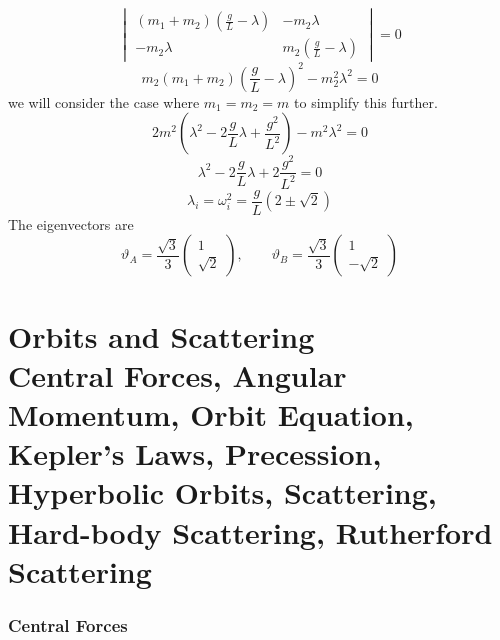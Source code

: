 \documentclass{article}
\begin{document}
    \[
    \begin{vmatrix}
        (m_1 + m_2)\left(\frac{g}{L} - \lambda\right) & -m_2\lambda\\
        -m_2\lambda & m_2\left(\frac{g}{L} - \lambda\right)
    \end{vmatrix}
    = 0
    \]
    \[m_2(m_1 + m_2)\left(\frac{g}{L} - \lambda\right)^2 - m_2^2\lambda^2 = 0\]
    we will consider the case where \(m_1 = m_2 = m\) to simplify this further.
    \[2m^2\left(\lambda^2 - 2\frac{g}{L}\lambda + \frac{g^2}{L^2}\right) - m^2\lambda^2 = 0\]
    \[\lambda^2 - 2\frac{g}{L}\lambda + 2\frac{g^2}{L^2} = 0\]
    \[\lambda_i = \omega_i^2 = \frac{g}{L}(2\pm\sqrt{2})\]
    The eigenvectors are
    \[\vartheta_A = \frac{\sqrt{3}}{3}\begin{pmatrix} 1 \\ \sqrt{2}\end{pmatrix},\qquad \vartheta_B = \frac{\sqrt{3}}{3}\begin{pmatrix}1 \\ -\sqrt{2}\end{pmatrix}\]
    
    \part[Orbits and Scattering]{Orbits and Scattering\\[\bigskipamount]\large Central Forces, Angular Momentum, Orbit Equation, Kepler's Laws, Precession, Hyperbolic Orbits, Scattering, Hard-body Scattering, Rutherford Scattering}
    
    \section{Central Forces}
\end{document}
